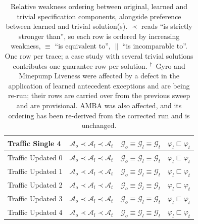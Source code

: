 \begin{table}[h]
\begin{tabular*}{\linewidth}{@{\extracolsep{\fill}}lccc@{}}
Traffic Single 4 & $\mathcal{A}_{o}\prec\mathcal{A}_{l}\prec\mathcal{A}_{t}$ & $\mathcal{G}_{o}\equiv\mathcal{G}_{l}\equiv\mathcal{G}_{t}$ & $\varphi_l\sqsubset \varphi_t$ \\
\hline
Traffic Updated 0 & $\mathcal{A}_{o}\prec\mathcal{A}_{l}\prec\mathcal{A}_{t}$ & $\mathcal{G}_{o}\equiv\mathcal{G}_{l}\equiv\mathcal{G}_{t}$ & $\varphi_l\sqsubset \varphi_t$ \\
Traffic Updated 1 & $\mathcal{A}_{o}\prec\mathcal{A}_{l}\prec\mathcal{A}_{t}$ & $\mathcal{G}_{o}\equiv\mathcal{G}_{l}\equiv\mathcal{G}_{t}$ & $\varphi_l\sqsubset \varphi_t$ \\
Traffic Updated 2 & $\mathcal{A}_{o}\prec\mathcal{A}_{l}\prec\mathcal{A}_{t}$ & $\mathcal{G}_{o}\equiv\mathcal{G}_{l}\equiv\mathcal{G}_{t}$ & $\varphi_l\sqsubset \varphi_t$ \\
Traffic Updated 3 & $\mathcal{A}_{o}\prec\mathcal{A}_{l}\prec\mathcal{A}_{t}$ & $\mathcal{G}_{o}\equiv\mathcal{G}_{l}\equiv\mathcal{G}_{t}$ & $\varphi_l\sqsubset \varphi_t$ \\
Traffic Updated 4 & $\mathcal{A}_{o}\prec\mathcal{A}_{l}\prec\mathcal{A}_{t}$ & $\mathcal{G}_{o}\equiv\mathcal{G}_{l}\equiv\mathcal{G}_{t}$ & $\varphi_l\sqsubset \varphi_t$ \\
\bottomrule
\end{tabular*}
\caption{Relative weakness ordering between original, learned and trivial specification components, alongside preference between learned and trivial solution(s). $\prec$ reads ``is strictly stronger than'', so each row is ordered by increasing weakness, $\equiv$ ``is equivalent to'', $\parallel$ ``is incomparable to''. One row per trace; a case study with several trivial solutions contributes one guarantee row per solution. $^\dagger$~Gyro and Minepump Liveness were affected by a defect in the application of learned antecedent exceptions and are being re-run; their rows are carried over from the previous sweep and are provisional. AMBA was also affected, and its ordering has been re-derived from the corrected run and is unchanged.}
\label{tab:ordering}
\end{table}
